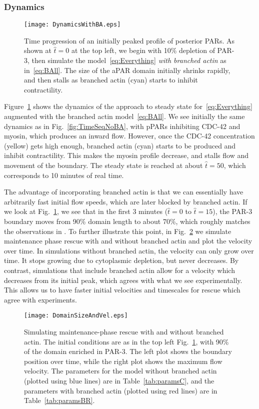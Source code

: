 \documentclass[11pt]{article}
\newcommand{\6}[1]{#1_{\text{6}}}
\newcommand{\3}[1]{#1_{\text{3}}}
\begin{document}
\subsubsection{Dynamics}
\begin{figure}
\centering
\texttt{[image: DynamicsWithBA.eps]}
\caption{\label{fig:TimeSeqBA} Time progression of an initially peaked profile of posterior PARs. As shown at $\hat t=0$ at the top left, we begin with 10\% depletion of PAR-3, then simulate the model\ \eqref{eq:Everything} \emph{with branched actin} as in\ \eqref{eq:BAll}. The size of the aPAR domain initially shrinks rapidly, and then stalls as branched actin (cyan) starts to inhibit contractility.}
\end{figure}

Figure\ \ref{fig:TimeSeqBA} shows the dynamics of the approach to steady state for\ \eqref{eq:Everything} augmented with the branched actin model\ \eqref{eq:BAll}. We see initially the same dynamics as in Fig.\ \ref{fig:TimeSeqNoBA}, with pPARs inhibiting CDC-42 and myosin, which produces an inward flow. However, once the CDC-42 concentration (yellow) gets high enough, branched actin (cyan) starts to be produced and inhibit contractility. This makes the myosin profile decrease, and stalls flow and movement of the boundary. The steady state is reached at about $\hat t = 50$, which corresponds to 10 minutes of real time. 

The advantage of incorporating branched actin is that we can essentially have arbitrarily fast initial flow speeds, which are later blocked by branched actin. If we look at Fig.\ \ref{fig:TimeSeqBA}, we see that in the first 3 minutes ($\hat t=0$ to $\hat t = 15$), the PAR-3 boundary moves from 90\% domain length to about 70\%, which roughly matches the observations in \cite[Fig.~7D]{tse2012rhoa}. To further illustrate this point, in Fig.\ \ref{fig:VelRescue} we simulate maintenance phase rescue with and without branched actin and plot the velocity over time. In simulations without branched actin, the velocity can only grow over time. It stops growing due to cytoplasmic depletion, but never decreases. By contrast, simulations that include branched actin allow for a velocity which decreases from its initial peak, which agrees with what we see experimentally. This allows us to have faster initial velocities and timescales for rescue which agree with experiments. 

\begin{figure}
\centering
\texttt{[image: DomainSizeAndVel.eps]}
\caption{\label{fig:VelRescue}Simulating maintenance-phase rescue with and without branched actin. The initial conditions are as in the top left Fig.\ \ref{fig:TimeSeqBA}, with 90\% of the domain enriched in PAR-3. The left plot shows the boundary position over time, while the right plot shows the maximum flow velocity. The parameters for the model without branched actin (plotted using blue lines) are in Table\ \ref{tab:paramsC}, and the parameters with branched actin (plotted using red lines) are in Table\ \ref{tab:paramsBR}. }
\end{figure}
\end{document}
